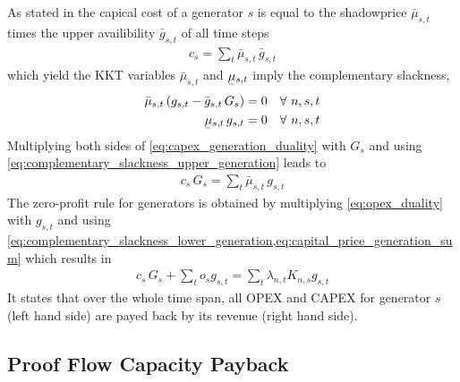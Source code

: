 \documentclass[11pt,twocolumn]{article}
\newcommand{\ubar}[1]{\underaccent{\bar}{#1}}
\newcommand{\Forall}[1]{\hspace{10pt} \forall \,\, #1 }
\newcommand{\generation}{g_{s,t}}
\newcommand{\generationpotential}{\bar{g}_{s,t}}
\newcommand{\capacityGeneration}{G_{s}}
\newcommand{\capexGeneration}{c_{s}}
\newcommand{\opexGeneration}{o_{s}}
\newcommand{\incidenceGenerators}[1][n]{K_{#1,s}}
\newcommand{\mulowergeneration}{\ubar{\mu}_{s,t}}
\newcommand{\muuppergeneration}{\bar{\mu}_{s,t}}
\newcommand{\lmp}[1][n]{\lambda_{#1,t}}
\begin{document}
As stated in \cite{brown_decreasing_2020} the capical cost of a generator $s$ is equal to the shadowprice $\muuppergeneration$ times the upper availibility $\generationpotential$ of all time steps 
\begin{align}
 \capexGeneration  = \sum_t \muuppergeneration \, \generationpotential 
 \label{eq:capital_price_generation_sum}
\end{align}
 which yield the KKT variables $\muuppergeneration$ and $\mulowergeneration$ imply the complementary slackness,
\begin{align}
\muuppergeneration \left( \generation - \generationpotential \, \capacityGeneration \right)  &= 0  \Forall{n,s,t} 
\label{eq:complementary_slackness_upper_generation} \\
\mulowergeneration  \, \generation &= 0 \Forall{n,s,t}
\label{eq:complementary_slackness_lower_generation} 
\end{align}
Multiplying both sides of \cref{eq:capex_generation_duality} with $\capacityGeneration$ and using \cref{eq:complementary_slackness_upper_generation} leads to 
\begin{align}
 \capexGeneration \, \capacityGeneration  = \sum_t \muuppergeneration \, \generation 
 \label{eq:capital_price_generation_sum}
\end{align}
The zero-profit rule for generators is obtained by multiplying \cref{eq:opex_duality} with $\generation$ and using \cref{eq:complementary_slackness_lower_generation,eq:capital_price_generation_sum} which results in 
\begin{align}
  \capexGeneration \, \capacityGeneration + \sum_t \opexGeneration \generation = \sum_t \lmp \incidenceGenerators \generation
\end{align}
It states that over the whole time span, all OPEX and CAPEX for generator $s$ (left hand side) are payed back by its revenue (right hand side).

\subsection{Proof Flow Capacity Payback}
\end{document}
